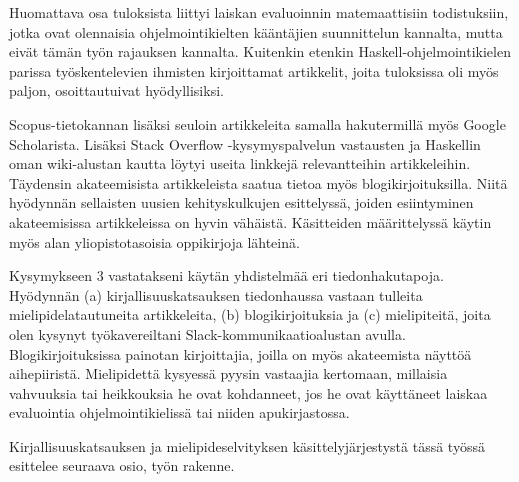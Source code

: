 Huomattava osa tuloksista liittyi laiskan evaluoinnin matemaattisiin todistuksiin, jotka ovat olennaisia ohjelmointikielten kääntäjien suunnittelun kannalta, mutta eivät tämän työn rajauksen kannalta. Kuitenkin etenkin Haskell-ohjelmointikielen parissa työskentelevien ihmisten kirjoittamat artikkelit, joita tuloksissa oli myös paljon, osoittautuivat hyödyllisiksi.

Scopus-tietokannan lisäksi seuloin artikkeleita samalla hakutermillä myös Google Scholarista. Lisäksi Stack Overflow -kysymyspalvelun vastausten ja Haskellin oman wiki-alustan kautta löytyi useita linkkejä relevantteihin artikkeleihin. Täydensin akateemisista artikkeleista saatua tietoa myös blogikirjoituksilla. Niitä hyödynnän sellaisten uusien kehityskulkujen esittelyssä, joiden esiintyminen akateemisissa artikkeleissa on hyvin vähäistä. Käsitteiden määrittelyssä käytin myös alan yliopistotasoisia oppikirjoja lähteinä.

\begin{sloppypar}
Kysymykseen 3 vastatakseni käytän yhdistelmää eri tiedonhakutapoja. Hyödynnän (a) kirjallisuuskatsauksen tiedonhaussa vastaan tulleita mielipidelatautuneita artikkeleita, (b) blogikirjoituksia ja (c) mielipiteitä, joita olen kysynyt työkavereiltani Slack-kommunikaatioalustan avulla. Blogikirjoituksissa painotan kirjoittajia, joilla on myös akateemista näyttöä aihepiiristä. Mielipidettä kysyessä pyysin vastaajia kertomaan, millaisia vahvuuksia tai heikkouksia he ovat kohdanneet, jos he ovat käyttäneet laiskaa evaluointia ohjelmointikielissä tai niiden apukirjastossa.
\end{sloppypar}

Kirjallisuuskatsauksen ja mielipideselvityksen käsittelyjärjestystä tässä työssä esittelee seuraava osio, työn rakenne.
